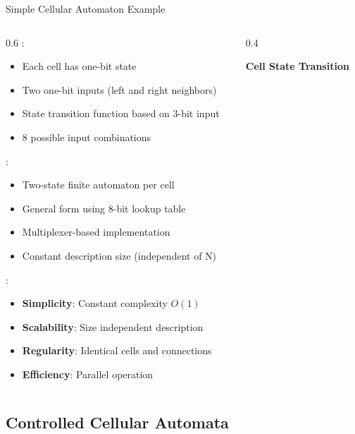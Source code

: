 \begin{frame}{Simple Cellular Automaton Example}
\begin{columns}
\begin{column}{0.6\textwidth}
:
\begin{itemize}
\item Each cell has one-bit state
\item Two one-bit inputs (left and right neighbors)
\item State transition function based on 3-bit input
\item 8 possible input combinations
\end{itemize}

\vspace{0.3cm}
:
\begin{itemize}
\item Two-state finite automaton per cell
\item General form using 8-bit lookup table
\item Multiplexer-based implementation
\item Constant description size (independent of N)
\end{itemize}

\vspace{0.3cm}
:
\begin{itemize}
\item \textbf{Simplicity}: Constant complexity $O(1)$
\item \textbf{Scalability}: Size independent description
\item \textbf{Regularity}: Identical cells and connections
\item \textbf{Efficiency}: Parallel operation
\end{itemize}
\end{column}
\begin{column}{0.4\textwidth}
\begin{center}
\textbf{Cell State Transition}
\vspace{0.3cm}


\end{center}
\end{column}
\end{columns}
\end{frame}

\subsection{Controlled Cellular Automata}

